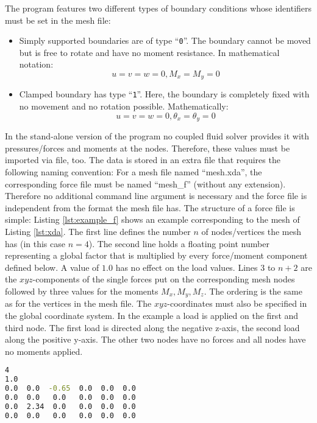    The program features two different types of boundary conditions whose identifiers must be set in the mesh file:
   \begin{itemize}
   	\item Simply supported boundaries are of type ``\texttt{0}''. The boundary cannot be moved but is free to rotate and have no moment resistance. In mathematical notation:
   	\begin{equation*}
   	u = v = w = 0, M_x = M_y = 0
   	\end{equation*}
   	\item Clamped boundary has type ``\texttt{1}''. Here, the boundary is completely fixed with no movement and no rotation possible. Mathematically:
   	\begin{equation*}
   	u = v = w = 0, \theta_x = \theta_y = 0
   	\end{equation*}
   \end{itemize}
   In the stand-alone version of the program no coupled fluid solver provides it with pressures/forces and moments at the nodes. Therefore, these values must be imported via file, too. The data is stored in an extra file that requires the following naming convention: For a mesh file named ``mesh.xda'', the corresponding force file must be named ``mesh\_f'' (without any extension). Therefore no additional command line argument is necessary and the force file is independent from the format the mesh file has. The structure of a force file is simple: Listing \ref{lst:example_f} shows an example corresponding to the mesh of Listing \ref{lst:xda}. The first line defines the number $n$ of nodes/vertices the mesh has (in this case $n=4$). The second line holds a floating point number representing a global factor that is multiplied by every force/moment component defined below. A value of $1.0$ has no effect on the load values. Lines 3 to $n+2$ are the $xyz$-components of the single forces put on the corresponding mesh nodes followed by three values for the moments $M_x, M_y, M_z$. The ordering is the same as for the vertices in the mesh file. The $xyz$-coordinates must also be specified in the global coordinate system. In the example a load is applied on the first and third node. The first load is directed along the negative z-axis, the second load along the positive y-axis. The other two nodes have no forces and all nodes have no moments applied.
\begin{lstlisting}[caption=Example force file,label=lst:example_f,language=bash,keepspaces=true]
4
1.0
0.0  0.0  -0.65  0.0  0.0  0.0
0.0  0.0   0.0   0.0  0.0  0.0
0.0  2.34  0.0   0.0  0.0  0.0
0.0  0.0   0.0   0.0  0.0  0.0
\end{lstlisting}
   
